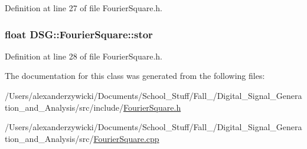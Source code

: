 Definition at line 27 of file Fourier\+Square.\+h.

\hypertarget{classDSG_1_1FourierSquare_a82bb1d630438aa3ca1d3b1264b8196a5}{
\subsubsection[{stor}]{\setlength{\rightskip}{0pt plus 5cm}float D\+S\+G\+::\+Fourier\+Square\+::stor\hspace{0.3cm}{\ttfamily [protected]}}}\label{classDSG_1_1FourierSquare_a82bb1d630438aa3ca1d3b1264b8196a5}


Definition at line 28 of file Fourier\+Square.\+h.



The documentation for this class was generated from the following files\+:\begin{DoxyCompactItemize}
\item 
/\+Users/alexanderzywicki/\+Documents/\+School\+\_\+\+Stuff/\+Fall\+\_/\+Digital\+\_\+\+Signal\+\_\+\+Generation\+\_\+and\+\_\+\+Analysis/src/include/\hyperlink{FourierSquare_8h}{Fourier\+Square.\+h}\item 
/\+Users/alexanderzywicki/\+Documents/\+School\+\_\+\+Stuff/\+Fall\+\_/\+Digital\+\_\+\+Signal\+\_\+\+Generation\+\_\+and\+\_\+\+Analysis/src/\hyperlink{FourierSquare_8cpp}{Fourier\+Square.\+cpp}\end{DoxyCompactItemize}
